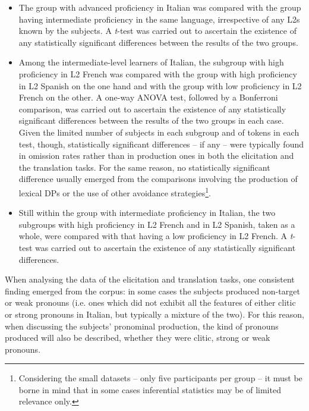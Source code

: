 \documentclass[output=paper,modfonts,nonflat,newtxmath]{langsci/langscibook}
\begin{document}
\begin{itemize}
\item The group with advanced proficiency in Italian was compared with the group having intermediate proficiency in the same language, irrespective of any L2s known by the subjects. A \textit{t}-test was carried out to ascertain the existence of any statistically significant differences between the results of the two groups.

\item Among the intermediate-level learners of Italian, the subgroup with high proficiency in L2 French was compared with the group with high proficiency in L2 Spanish on the one hand and with the group with low proficiency in L2 French on the other. A one-way ANOVA test, followed by a Bonferroni comparison, was carried out to ascertain the existence of any statistically significant differences between the results of the two groups in each case. Given the limited number of subjects in each subgroup and of tokens in each test, though, statistically significant differences – if any – were typically found in omission rates rather than in production ones in both the elicitation and the translation tasks. For the same reason, no statistically significant difference usually emerged from the comparisons involving the production of lexical DPs or the use of other avoidance strategies\footnote{ \textrm{Considering the small datasets – only five participants per group – it must be borne in mind that in some cases inferential statistics may be of limited relevance only.}}.

\item Still within the group with intermediate proficiency in Italian, the two subgroups with high proficiency in L2 French and in L2 Spanish, taken as a whole, were compared with that having a low proficiency in L2 French. A \textit{t}{}-test was carried out to ascertain the existence of any statistically significant differences.
\end{itemize}

When analysing the data of the elicitation and translation tasks, one consistent finding emerged from the corpus: in some cases the subjects produced non-target or weak pronouns (i.e. ones which did not exhibit all the features of either clitic or strong pronouns in Italian, but typically a mixture of the two). For this reason, when discussing the subjects’ pronominal production, the kind of pronouns produced will also be described, whether they were clitic, strong or weak pronouns.
\end{document}
